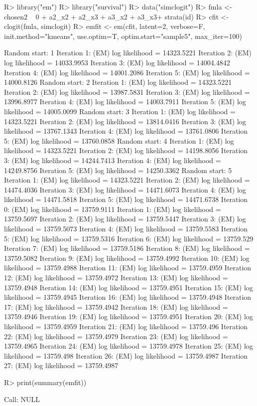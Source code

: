 \documentclass[nojss]{jss}
\begin{document}
\begin{Schunk}
\begin{Sinput}
R> library("em")
R> library("survival")
R> data("simclogit")
R> fmla <- chosen2 ~ 0 + a2_x2 + a2_x3 + a3_x2 + a3_x3+ strata(id)
R> cfit <- clogit(fmla, simclogit)
R> emfit <- em(cfit, latent=2, verbose=F, init.method="kmeans", use.optim=T, optim.start="sample5", max_iter=100)
\end{Sinput}
\begin{Soutput}
Random start: 1
Iteration 1: (EM) log likelihood = 14323.5221
Iteration 2: (EM) log likelihood = 14033.9953
Iteration 3: (EM) log likelihood = 14004.4842
Iteration 4: (EM) log likelihood = 14001.2086
Iteration 5: (EM) log likelihood = 14000.8126
Random start: 2
Iteration 1: (EM) log likelihood = 14323.5221
Iteration 2: (EM) log likelihood = 13987.5831
Iteration 3: (EM) log likelihood = 13996.8977
Iteration 4: (EM) log likelihood = 14003.7911
Iteration 5: (EM) log likelihood = 14005.0099
Random start: 3
Iteration 1: (EM) log likelihood = 14323.5221
Iteration 2: (EM) log likelihood = 13814.0416
Iteration 3: (EM) log likelihood = 13767.1343
Iteration 4: (EM) log likelihood = 13761.0806
Iteration 5: (EM) log likelihood = 13760.0858
Random start: 4
Iteration 1: (EM) log likelihood = 14323.5221
Iteration 2: (EM) log likelihood = 14198.8056
Iteration 3: (EM) log likelihood = 14244.7413
Iteration 4: (EM) log likelihood = 14249.8756
Iteration 5: (EM) log likelihood = 14250.3362
Random start: 5
Iteration 1: (EM) log likelihood = 14323.5221
Iteration 2: (EM) log likelihood = 14474.4036
Iteration 3: (EM) log likelihood = 14471.6073
Iteration 4: (EM) log likelihood = 14471.5818
Iteration 5: (EM) log likelihood = 14471.6738
Iteration 0: (EM) log likelihood = 13759.9111
Iteration 1: (EM) log likelihood = 13759.5697
Iteration 2: (EM) log likelihood = 13759.5447
Iteration 3: (EM) log likelihood = 13759.5073
Iteration 4: (EM) log likelihood = 13759.5583
Iteration 5: (EM) log likelihood = 13759.5316
Iteration 6: (EM) log likelihood = 13759.529
Iteration 7: (EM) log likelihood = 13759.5186
Iteration 8: (EM) log likelihood = 13759.5082
Iteration 9: (EM) log likelihood = 13759.4992
Iteration 10: (EM) log likelihood = 13759.4988
Iteration 11: (EM) log likelihood = 13759.4959
Iteration 12: (EM) log likelihood = 13759.4972
Iteration 13: (EM) log likelihood = 13759.4948
Iteration 14: (EM) log likelihood = 13759.4951
Iteration 15: (EM) log likelihood = 13759.4945
Iteration 16: (EM) log likelihood = 13759.4948
Iteration 17: (EM) log likelihood = 13759.4942
Iteration 18: (EM) log likelihood = 13759.4946
Iteration 19: (EM) log likelihood = 13759.4951
Iteration 20: (EM) log likelihood = 13759.4959
Iteration 21: (EM) log likelihood = 13759.496
Iteration 22: (EM) log likelihood = 13759.4979
Iteration 23: (EM) log likelihood = 13759.4965
Iteration 24: (EM) log likelihood = 13759.4978
Iteration 25: (EM) log likelihood = 13759.498
Iteration 26: (EM) log likelihood = 13759.4987
Iteration 27: (EM) log likelihood = 13759.4987
\end{Soutput}
\begin{Sinput}
R> print(summary(emfit))
\end{Sinput}
\begin{Soutput}
Call:
NULL


\end{Soutput}
\end{Schunk}
\end{document}
